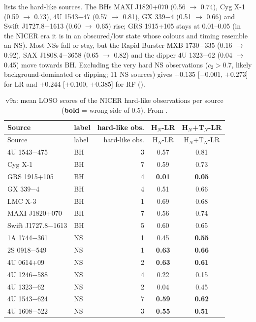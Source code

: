  lists the hard-like sources. The BHs MAXI J1820+070 (0.56 $\to$ 0.74), Cyg X-1 (0.59 $\to$ 0.73), 4U 1543$-$47
(0.57 $\to$ 0.81), GX 339$-$4 (0.51 $\to$ 0.66) and Swift J1727.8$-$1613 (0.60 $\to$ 0.65) rise; GRS 1915+105 stays at 0.01--0.05 (in
the NICER era it is in an obscured/low state whose colours and timing resemble an NS). Most NSs fall or stay, but the Rapid Burster
MXB 1730$-$335 (0.16 $\to$ 0.92), SAX J1808.4$-$3658 (0.65 $\to$ 0.82) and the dipper 4U 1323$-$62 (0.04 $\to$ 0.45) move towards BH.
\PostHoc{} Excluding the very hard NS observations ($c_2>0.7$, likely background-dominated or dipping; 11 NS sources) gives
$+0.135$ [$-0.001$, $+0.273$] for LR and $+0.244$ [$+0.100$, $+0.385$] for RF ().

{\footnotesize
\begin{longtable}{@{}llrcc@{}}
\caption[NICER hard-like scores per source]{v9a: mean LOSO scores of the NICER hard-like observations per source (\textbf{bold} =
wrong side of 0.5). From .}\label{tab:p5v9asrc}\\
\toprule
Source & label & hard-like obs. & H$_N$-LR & H$_N$+T$_N$-LR \\
\midrule\endfirsthead
\toprule Source & label & hard-like obs. & H$_N$-LR & H$_N$+T$_N$-LR \\ \midrule\endhead
\bottomrule\endfoot
4U 1543$-$475 & BH & 3 & 0.57 & 0.81 \\
Cyg X-1 & BH & 7 & 0.59 & 0.73 \\
GRS 1915+105 & BH & 4 & \textbf{0.01} & \textbf{0.05} \\
GX 339$-$4 & BH & 4 & 0.51 & 0.66 \\
LMC X-3 & BH & 1 & 0.69 & 0.68 \\
MAXI J1820+070 & BH & 7 & 0.56 & 0.74 \\
Swift J1727.8$-$1613 & BH & 5 & 0.60 & 0.65 \\
1A 1744$-$361 & NS & 1 & 0.45 & \textbf{0.55} \\
2S 0918$-$549 & NS & 1 & \textbf{0.63} & \textbf{0.66} \\
4U 0614+09 & NS & 2 & \textbf{0.63} & \textbf{0.61} \\
4U 1246$-$588 & NS & 4 & 0.22 & 0.15 \\
4U 1323$-$62 & NS & 2 & 0.04 & 0.45 \\
4U 1543$-$624 & NS & 7 & \textbf{0.59} & \textbf{0.62} \\
4U 1608$-$522 & NS & 3 & \textbf{0.55} & \textbf{0.51} \\

\end{longtable}}
